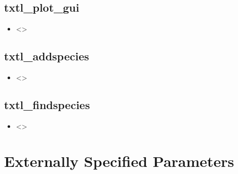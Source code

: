\documentclass[english]{report}
\begin{document}
		\subsection*{txtl\_plot\_gui}
			\begin{itemize}
			\item <>
			\end{itemize}		
		\subsection*{txtl\_addspecies}
			\begin{itemize}
			\item <>
			\end{itemize}		
		\subsection*{txtl\_findspecies}
			\begin{itemize}
			\item <>
			\end{itemize}		
	\section{Externally Specified Parameters}
\end{document}
